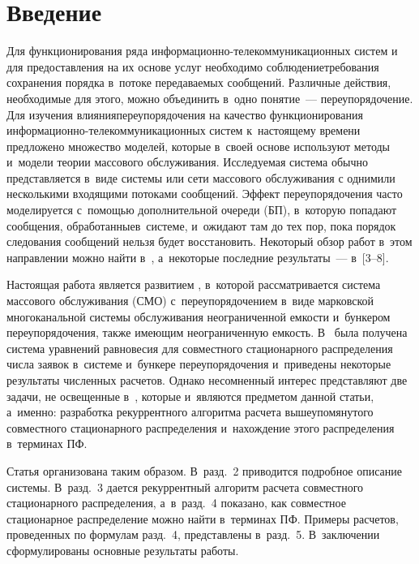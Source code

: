 \thispagestyle{headings}

\begin{multicols}{2}

\label{st\stat}


\section{Введение}

Для функционирования ряда
ин\-фор\-ма\-ци\-он\-но-те\-ле\-ком\-му\-ни\-ка\-ци\-он\-ных сис\-тем
и для предоставления на их основе услуг
необходимо соблюдение\linebreak требования сохранения порядка в~потоке передаваемых сообщений.
Различные действия, необходимые для этого, можно объединить
в~одно понятие~--- переупорядочение.
Для изучения влияния\linebreak \mbox{переупорядочения} на качество
функционирования ин\-фор\-ма\-ци\-он\-но-те\-ле\-ком\-му\-ни\-ка\-ци\-он\-ных
сис\-тем к~настоящему времени предложено множество
моделей, которые в~своей основе используют методы
и~модели теории массового обслуживания.
Исследуемая сис\-те\-ма обычно представляется в~виде
системы или сети массового обслуживания с одним\linebreak или
несколькими входящими потоками сообщений.
Эффект переупорядочения часто моделируется с~помощью
дополнительной очереди (БП),
в~которую попадают сообщения, обработанные\linebreak в~системе,
и~ожидают там до тех пор, пока порядок следования сообщений
нельзя будет восстановить.
Некоторый обзор работ в~этом направлении можно найти
в~\cite{a1, a2},
а~некоторые последние результаты~--- в~[3--8].

Настоящая работа является развитием \cite{a8}, в~которой
рассматривается система массового обслуживания (СМО)
с~переупорядочением в~виде марковской многоканальной
системы обслуживания неограниченной емкости и~бункером
переупорядочения, также имеющим неограниченную
емкость.
В~\cite{a8} была получена система уравнений равновесия для
совместного стационарного распределения чис\-ла заявок в~системе
и~бункере переупорядочения и~приведены некоторые результаты
численных расчетов.
Однако несомненный интерес представляют
две задачи, не освещенные в~\cite{a8}, которые и~являются
предметом данной статьи, а~именно:
разработка рекуррентного алгоритма расчета вышеупомянутого
совместного стационарного распределения и~нахождение
этого распределения в~терминах ПФ.

Статья организована таким образом.
В~разд.~2 приводится подробное описание
системы.
В~разд.~3 дается рекуррентный алгоритм расчета
совместного стационарного распределения, а~в~разд.~4
показано, как совместное стационарное распределение
можно найти в~терминах ПФ.
Примеры расчетов, проведенных по формулам разд.~4,
представлены в~разд.~5.
В~заключении сформулированы основные результаты работы.


\end{multicols}

